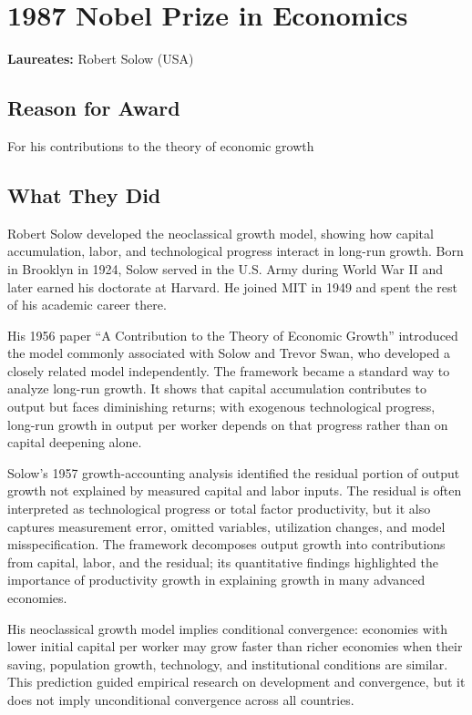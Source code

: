\chapter{1987 Nobel Prize in Economics}
\textbf{Laureates: }Robert Solow (USA)

\section*{Reason for Award}
For his contributions to the theory of economic growth

\section{What They Did}
Robert Solow developed the neoclassical growth model, showing how capital
accumulation, labor, and technological progress interact in long-run growth.
Born in Brooklyn in 1924, Solow served in the U.S. Army during World War II
and later earned his doctorate at Harvard. He joined MIT in 1949 and spent the
rest of his academic career there.

His 1956 paper ``A Contribution to the Theory of Economic Growth'' introduced
the model commonly associated with Solow and Trevor Swan, who developed a
closely related model independently. The framework became a standard way to
analyze long-run growth. It shows that capital accumulation contributes to
output but faces diminishing returns; with exogenous technological progress,
long-run growth in output per worker depends on that progress rather than on
capital deepening alone.

Solow's 1957 growth-accounting analysis identified the residual portion of
output growth not explained by measured capital and labor inputs. The residual
is often interpreted as technological progress or total factor productivity,
but it also captures measurement error, omitted variables, utilization changes,
and model misspecification. The framework decomposes output growth into
contributions from capital, labor, and the residual; its quantitative findings
highlighted the importance of productivity growth in explaining growth in
many advanced economies.

His neoclassical growth model implies conditional convergence: economies with
lower initial capital per worker may grow faster than richer economies when
their saving, population growth, technology, and institutional conditions are
similar. This prediction guided empirical research on development and
convergence, but it does not imply unconditional convergence across all
countries.

